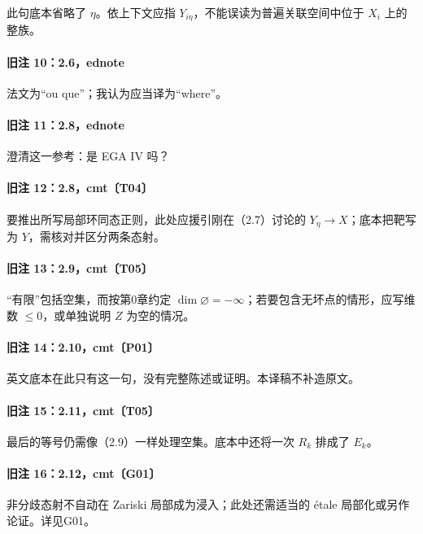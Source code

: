 \documentclass[UTF8,a4paper]{ctexbook}
\begin{document}
此句底本省略了 $\eta$。依上下文应指 $Y_{i\eta}$，不能误读为普遍关联空间中位于 $X_i$ 上的整族。

\paragraph{旧注 10：2.6，ednote}

法文为“ou que”；我认为应当译为“where”。

\paragraph{旧注 11：2.8，ednote}

澄清这一参考：是 EGA IV 吗？

\paragraph{旧注 12：2.8，cmt〔T04〕}

要推出所写局部环同态正则，此处应援引刚在（2.7）讨论的 $Y_\eta\to X$；底本把靶写为 $Y$，需核对并区分两条态射。

\paragraph{旧注 13：2.9，cmt〔T05〕}

“有限”包括空集，而按第0章约定 $\dim\varnothing=-\infty$；若要包含无坏点的情形，应写维数 $\leq0$，或单独说明 $Z$ 为空的情况。

\paragraph{旧注 14：2.10，cmt〔P01〕}

英文底本在此只有这一句，没有完整陈述或证明。本译稿不补造原文。

\paragraph{旧注 15：2.11，cmt〔T05〕}

最后的等号仍需像（2.9）一样处理空集。底本中还将一次 $R_k$ 排成了 $E_k$。

\paragraph{旧注 16：2.12，cmt〔G01〕}

非分歧态射不自动在 Zariski 局部成为浸入；此处还需适当的 étale 局部化或另作论证。详见G01。
\end{document}
